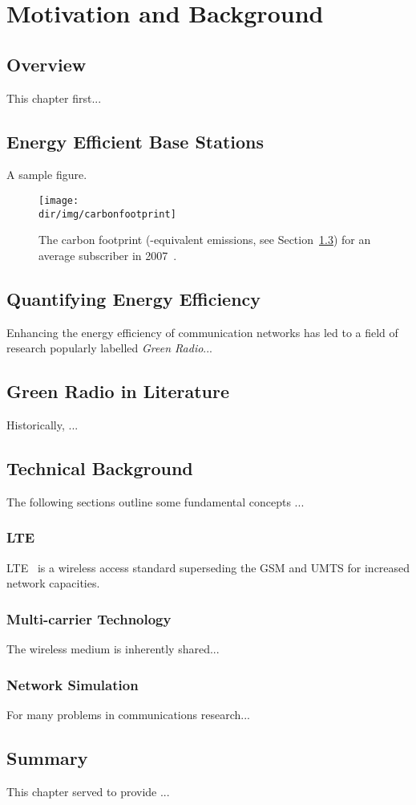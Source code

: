 \chapter{Motivation and Background}
\label{ch:motivation}

\section{Overview}
This chapter first...

\section{Energy Efficient Base Stations}
\label{sect:eebs}
A sample figure.

\begin{figure}
\centering
\texttt{[image: \\dir/img/carbonfootprint]}
\caption[The carbon footprint for an average subscriber in 2007]{The carbon footprint (\coo-equivalent emissions, see Section~\ref{sect:quantEE}) for an average subscriber in 2007~\cite{mmlfl1001}.} %
\label{fig:4}
\end{figure}

\section{Quantifying Energy Efficiency}
\label{sect:quantEE}
Enhancing the energy efficiency of communication networks has led to a field of research popularly labelled \emph{Green Radio}...

\section{Green Radio in Literature}
Historically, ...

\section{Technical Background}
\label{background}

The following sections outline some fundamental concepts ...

\subsection{\ac{LTE}}

\ac{LTE}~\cite{book:dps1101} is a wireless access standard superseding the \ac{GSM} and \ac{UMTS} for increased network capacities. 

\subsection{Multi-carrier Technology}
\label{sect:multicarrier}
The wireless medium is inherently shared...

\subsection{Network Simulation}

For many problems in communications research...

\section{Summary}
This chapter served to provide ...

